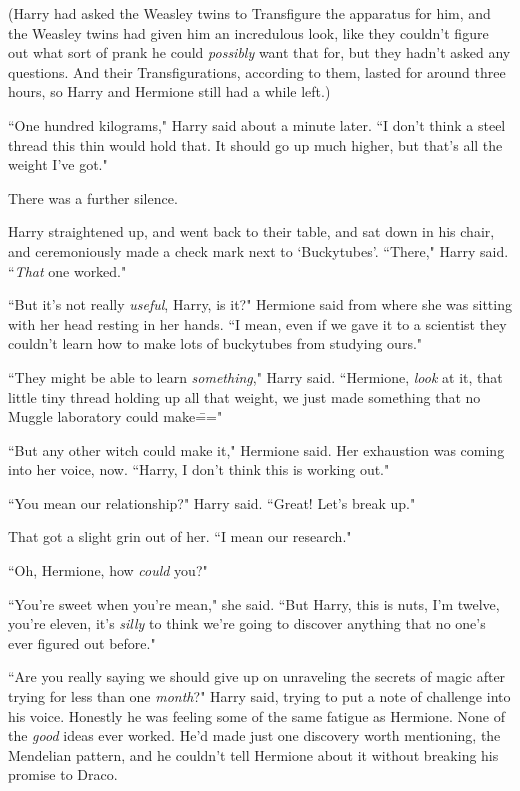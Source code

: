 (Harry had asked the Weasley twins to Transfigure the apparatus for him, and the Weasley twins had given him an incredulous look, like they couldn't figure out what sort of prank he could \emph{possibly} want that for, but they hadn't asked any questions. And their Transfigurations, according to them, lasted for around three hours, so Harry and Hermione still had a while left.)

``One hundred kilograms," Harry said about a minute later. ``I don't think a steel thread this thin would hold that. It should go up much higher, but that's all the weight I've got."

There was a further silence.

Harry straightened up, and went back to their table, and sat down in his chair, and ceremoniously made a check mark next to `Buckytubes'. ``There," Harry said. ``\emph{That} one worked."

``But it's not really \emph{useful}, Harry, is it?" Hermione said from where she was sitting with her head resting in her hands. ``I mean, even if we gave it to a scientist they couldn't learn how to make lots of buckytubes from studying ours."

``They might be able to learn \emph{something}," Harry said. ``Hermione, \emph{look} at it, that little tiny thread holding up all that weight, we just made something that no Muggle laboratory could make\==="

``But any other witch could make it," Hermione said. Her exhaustion was coming into her voice, now. ``Harry, I don't think this is working out."

``You mean our relationship?" Harry said. ``Great! Let's break up."

That got a slight grin out of her. ``I mean our research."

``Oh, Hermione, how \emph{could} you?"

``You're sweet when you're mean," she said. ``But Harry, this is nuts, I'm twelve, you're eleven, it's \emph{silly} to think we're going to discover anything that no one's ever figured out before."

``Are you really saying we should give up on unraveling the secrets of magic after trying for less than one \emph{month}?" Harry said, trying to put a note of challenge into his voice. Honestly he was feeling some of the same fatigue as Hermione. None of the \emph{good} ideas ever worked. He'd made just one discovery worth mentioning, the Mendelian pattern, and he couldn't tell Hermione about it without breaking his promise to Draco.

